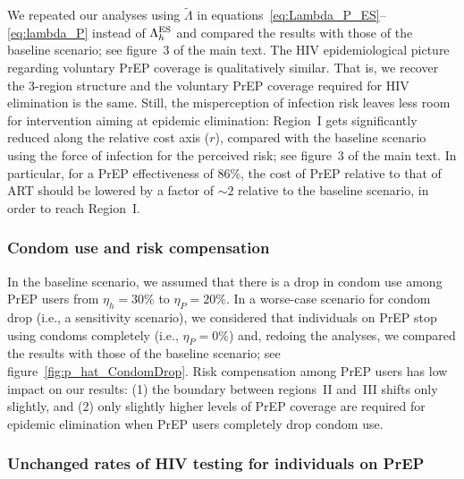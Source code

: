 \documentclass[11pt]{article}
\begin{document}
We repeated our analyses using $\tilde{\Lambda}$ in equations~\eqref{eq:Lambda_P_ES}--\eqref{eq:lambda_P} instead of $\Lambda_h^{\rm ES}$ and compared the results with those of the baseline scenario; see figure~3 of the main text. The HIV epidemiological picture regarding voluntary PrEP coverage is qualitatively similar. That is, we recover the 3-region structure and the voluntary PrEP coverage required for HIV elimination is the same. Still, the misperception of infection risk leaves less room for intervention aiming at epidemic elimination: Region~I gets significantly reduced along the relative cost axis ($r$), compared with the baseline scenario using the force of infection for the perceived risk; see figure~3 of the main text. In particular, for a PrEP effectiveness of 86\%, the cost of PrEP relative to that of ART should be lowered by a factor of $\sim 2$ relative to the baseline scenario, in order to reach Region~I. 

\subsubsection{Condom use and risk compensation}

In the baseline scenario, we assumed that there is a drop in condom use among PrEP users from $\eta_h=30\%$ to $\eta_P=20\%$. In a worse-case scenario for condom drop (i.e., a sensitivity scenario), we considered that individuals on PrEP stop using condoms completely (i.e., $\eta_P=0\%$) and, redoing the analyses, we compared the results with those of the baseline scenario; see figure~\ref{fig:p_hat_CondomDrop}. Risk compensation among PrEP users has low impact on our results: (1) the boundary between regions~II and~III shifts only slightly, and (2) only slightly higher levels of PrEP coverage are required for epidemic elimination when PrEP users completely drop condom use.


\subsubsection{Unchanged rates of HIV testing for individuals on PrEP}
\end{document}
